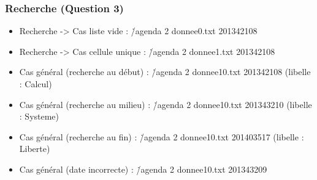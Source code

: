 \documentclass{report}
\begin{document}
\newpage
\subsubsection{Recherche (Question 3)}
\begin{itemize}

    \item Recherche -> Cas liste vide : \./agenda 2 donnee0.txt 201342108
\vspace{0.5cm}

\vspace{0.5cm}

    \item Recherche -> Cas cellule unique : \./agenda 2 donnee1.txt 201342108
\vspace{0.5cm}

\vspace{0.5cm}

    \item Cas général (recherche au début) : \./agenda 2 donnee10.txt 201342108 (libelle : Calcul)
\vspace{0.5cm}

\vspace{0.5cm}

    \item Cas général (recherche au milieu) : \./agenda 2 donnee10.txt 201343210 (libelle : Systeme)
\vspace{0.5cm}

\vspace{0.5cm}

    \item Cas général (recherche au fin) : \./agenda 2 donnee10.txt 201403517 (libelle : Liberte)
\vspace{0.5cm}

\vspace{0.5cm}

    \item Cas général (date incorrecte) : \./agenda 2 donnee10.txt 201343209
\vspace{0.5cm}

\end{itemize}

\newpage
\end{document}
